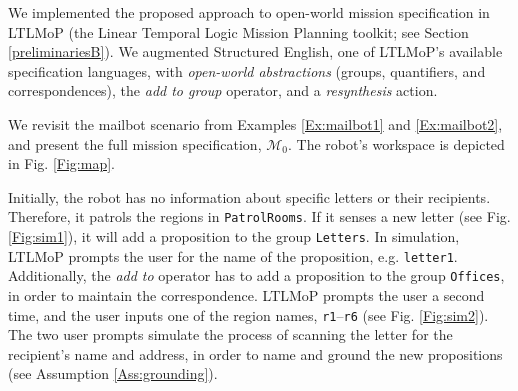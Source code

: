 We implemented the proposed approach to open-world mission specification in LTLMoP (the Linear Temporal Logic Mission Planning toolkit; see Section \ref{preliminariesB}). We augmented Structured English, one of LTLMoP's available specification languages, with \emph{open-world abstractions} (groups, quantifiers, and correspondences), the \emph{add to group} operator, and a \emph{resynthesis} action.

\begin{myExample}\label{Ex:mailbot3} We revisit the mailbot scenario from Examples \ref{Ex:mailbot1} and \ref{Ex:mailbot2}, and present the full mission specification, $\mathcal{M}_0$. The robot's workspace is depicted in Fig. \ref{Fig:map}.
\end{myExample}

Initially, the robot has no information about specific letters or their recipients. Therefore, it patrols the regions in \texttt{PatrolRooms}. If it senses a new letter (see Fig. \ref{Fig:sim1}), it will add a proposition to the group \texttt{Letters}. In simulation, LTLMoP prompts the user for the name of the proposition, e.g. \texttt{letter1}. Additionally, the \emph{add to} operator has to add a proposition to the group \texttt{Offices}, in order to maintain the correspondence. LTLMoP prompts the user a second time, and the user inputs one of the region names, \texttt{r1}--\texttt{r6} (see Fig. \ref{Fig:sim2}). The two user prompts simulate the process of scanning the letter for the recipient's name and address, in order to name and ground the new propositions (see Assumption \ref{Ass:grounding}).

